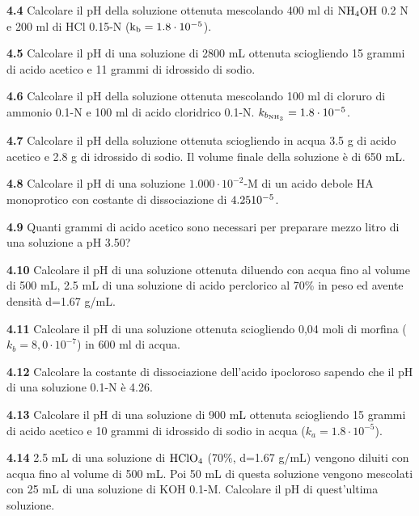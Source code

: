 \vspace{0.2cm}\textbf{4.4} Calcolare il pH della soluzione ottenuta mescolando 400 ml di $\rm NH_4OH$ 0.2 N e 200 ml di HCl 0.15-N ($\rm k_b = 1.8 \cdot 10^{-5}$).

\vspace{0.2cm}\textbf{4.5} Calcolare il pH di una soluzione di 2800 mL ottenuta sciogliendo 15 grammi di acido acetico e 11 grammi di idrossido di sodio.

\vspace{0.2cm}\textbf{4.6} Calcolare il pH della soluzione ottenuta mescolando 100 ml di cloruro di ammonio 0.1-N e 100
ml di acido cloridrico 0.1-N. $k_{b_{\rm NH_3}}=1.8 \cdot 10^{-5}$.

\vspace{0.2cm}\textbf{4.7} Calcolare il pH della soluzione ottenuta sciogliendo in acqua 3.5 g di acido acetico e 2.8 g di idrossido di sodio. Il volume finale della soluzione è di 650 mL.

\vspace{0.2cm}\textbf{4.8} Calcolare il pH di una soluzione $1.000 \cdot 10^{-2}$-M di un acido debole HA monoprotico con costante di dissociazione di $4.25 \rm  10^{-5}$.

\vspace{0.2cm}\textbf{4.9} Quanti grammi di acido acetico sono necessari per preparare mezzo litro di una soluzione a pH 3.50?

\vspace{0.2cm}\textbf{4.10} Calcolare il pH di una soluzione ottenuta diluendo con acqua fino al volume di 500 mL, 2.5 mL
di una soluzione di acido perclorico al 70\% in peso ed avente densità d=1.67 g/mL.

\vspace{0.2cm}\textbf{4.11} Calcolare il pH di una soluzione ottenuta sciogliendo 0,04 moli di morfina ($k_b = 8,0 \cdot 10^{-7}$) in 600 ml di acqua.

\vspace{0.2cm}\textbf{4.12} Calcolare la costante di dissociazione dell’acido ipocloroso sapendo che il pH di una soluzione 0.1-N è 4.26.

\vspace{0.2cm}\textbf{4.13} Calcolare il pH di una soluzione di 900 mL ottenuta sciogliendo 15 grammi di acido acetico e 10 grammi di idrossido di sodio in acqua ($k_a = 1.8 \cdot 10^{-5}$).

\vspace{0.2cm}\textbf{4.14} 2.5 mL di una soluzione di $\rm HClO_4$ (70\%, d=1.67 g/mL) vengono diluiti con acqua fino al
volume di 500 mL. Poi 50 mL di questa soluzione vengono mescolati con 25 mL di una soluzione di KOH 0.1-M. Calcolare il pH di quest’ultima soluzione.


